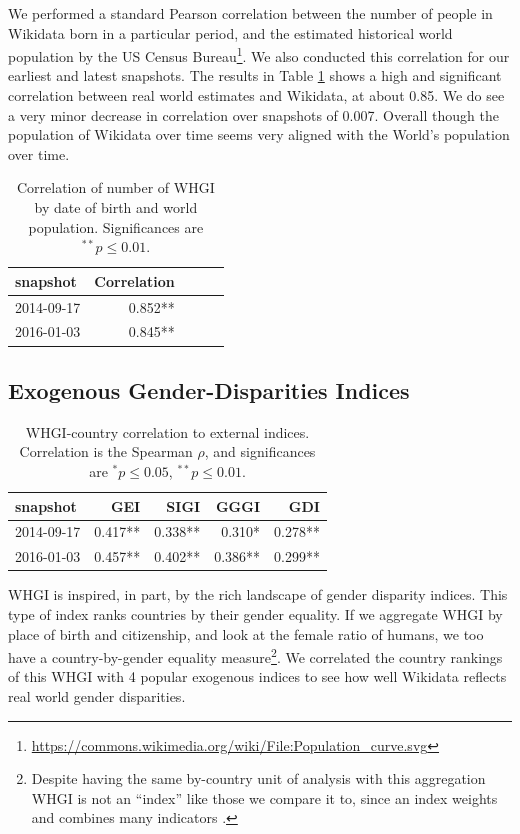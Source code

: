 \documentclass[letterpaper]{article}
\begin{document}
We performed a standard Pearson correlation between the number of people in Wikidata born in a particular period, and the estimated historical world population by the US Census
Bureau\footnote{\url{https://commons.wikimedia.org/wiki/File:Population_curve.svg}}.
We also conducted this correlation for our earliest and latest snapshots. The results in Table \ref{table:worldpop} shows a high and significant correlation between real world estimates and Wikidata, at about 0.85. We do see a very minor decrease in correlation over snapshots of 0.007. Overall though the population of Wikidata over time seems very aligned with the World's population over time.

\begin{table}
\caption{Correlation of number of WHGI by date of birth and world population. Significances are $ ^{**}p\leq 0.01$.}
\label{table:worldpop}
\begin{tabular}{lrrrr}
\toprule
snapshot &  Correlation \\
\midrule
2014-09-17 & 0.852**  \\
2016-01-03 & 0.845**  \\
\bottomrule
\end{tabular}
\end{table}

\subsection{Exogenous Gender-Disparities Indices}
\begin{table}
\caption{WHGI-country correlation to external indices. Correlation is the Spearman $\rho$, and significances are $ ^*p\leq 0.05 $, $ ^{**}p\leq 0.01$.}
\label{table:scores}
\begin{tabular}{lrrrr}
\toprule
snapshot &  GEI &  SIGI &  GGGI &  GDI  \\
\midrule
2014-09-17 &  0.417** &       0.338** &          0.310* &         0.278**  \\
2016-01-03 &  0.457** &       0.402** &          0.386** &         0.299**  \\
\bottomrule
\end{tabular}
\end{table}

WHGI is inspired, in part, by the rich landscape of gender disparity indices. This type of index ranks countries by their gender equality. If we aggregate WHGI by place of birth and citizenship, and look at the female ratio of humans, we too have a country-by-gender equality measure\footnote{Despite having the same by-country unit of analysis with this aggregation WHGI is not an ``index'' like those we compare it to, since an index weights and combines many indicators \cite{rossi_handbook_1980}. }.  We correlated the country rankings of this WHGI with 4 popular exogenous indices to see how well Wikidata reflects real world gender disparities. 
\end{document}
